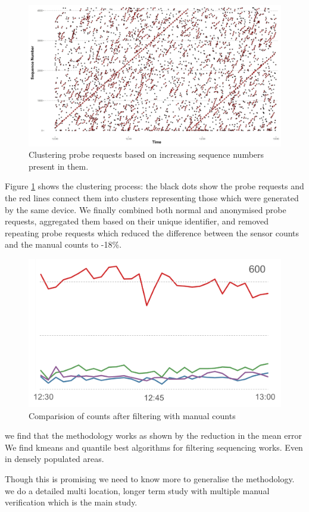 \begin{figure}
	\begin{center}
		\includegraphics [width=\linewidth,trim=4 4 4 4,clip] {images/methodology_clustering.png}
		\caption{Clustering probe requests based on increasing sequence numbers present in them.}
		\label{clustering_pilot}
	\end{center}
\end{figure}


Figure \ref{clustering_pilot} shows the clustering process: 
the black dots show the probe requests and the red lines 
connect them into clusters representing those which were
generated by the same device.
We finally combined both normal and anonymised probe requests,
aggregated them based on their unique identifier, and
removed repeating probe requests which reduced the difference
between the sensor counts and the manual counts to -18\%.

\begin{figure}
	\begin{center}
		\includegraphics [width=\linewidth] {images/pilot_counts_comparision.png}
		\caption{Comparision of counts after filtering with manual counts}
		\label{comparision_pilot}
	\end{center}
\end{figure}

we find that the methodology works as shown by the reduction in the
mean error
We find kmeans and quantile best algorithms for filtering
sequencing works. Even in densely populated areas.

Though this is promising we need to know more to generalise the methodology.
we do a detailed multi location, longer term study with multiple manual
verification which is the main study.
